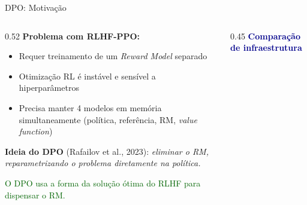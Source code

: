 \documentclass[aspectratio=169, xcolor=dvipsnames]{beamer}
\begin{document}
  \begin{frame}{DPO: Motivação}
    \begin{columns}
      \begin{column}{0.52\textwidth}
        \textbf{Problema com RLHF-PPO:}
        \begin{itemize}
          \item Requer treinamento de um \textit{Reward Model} separado
          \item Otimização RL é instável e sensível a hiperparâmetros
          \item Precisa manter 4 modelos em memória simultaneamente
            (política, referência, RM, \textit{value function})
        \end{itemize}

        \textbf{Ideia do DPO} (Rafailov et al., 2023): \textit{eliminar o RM, reparametrizando o problema diretamente na política.}

        \textcolor{DarkGreen}{\small O DPO usa a forma da solução ótima do RLHF para dispensar o RM.}
      \end{column}
      \begin{column}{0.45\textwidth}
        \textcolor{DarkBlue}{\textbf{Comparação de infraestrutura}}
        \vspace{0.3em}

      \end{column}
    \end{columns}


\end{frame}
\end{document}
